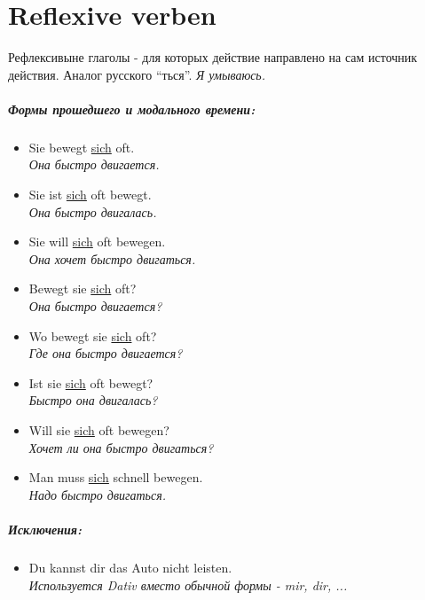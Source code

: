 \documentclass[12pt,a4paper]{report}
\newcommand{\satzew}[1]{\underline{#1}}
\newcommand{\ubersatze}[1]{\textit{#1}}
\begin{document}
\chapter{Reflexive verben}
Рефлексивыне глаголы - для которых действие направлено на сам источник действия. Аналог русского ``ться''. \ubersatze{Я умываюсь.}
\paragraph{Формы прошедшего и модального времени:}
\begin{itemize}
\item Sie bewegt \satzew{sich} oft.
~\\ \ubersatze{Она быстро двигается.}
\item Sie ist \satzew{sich} oft bewegt.
~\\ \ubersatze{Она быстро двигалась.}
\item Sie will \satzew{sich} oft bewegen.
~\\ \ubersatze{Она хочет быстро двигаться.}
\item Bewegt sie \satzew{sich} oft? 
~\\ \ubersatze{Она быстро двигается?}
\item Wo bewegt sie \satzew{sich} oft?
~\\ \ubersatze{Где она быстро двигается?}
\item Ist sie \satzew{sich} oft bewegt? 
~\\ \ubersatze{Быстро она двигалась?}
\item Will sie \satzew{sich} oft bewegen?
~\\ \ubersatze{Хочет ли она быстро двигаться?}
\item Man muss \satzew{sich} schnell bewegen.
~\\ \ubersatze{Надо быстро двигаться.}
\end{itemize}

\paragraph{Исключения:}
\begin{itemize}
\item Du  kannst dir das Auto nicht leisten.
~\\ \ubersatze{Используется Dativ вместо обычной формы - mir, dir, ...}
\end{itemize}
\end{document}
